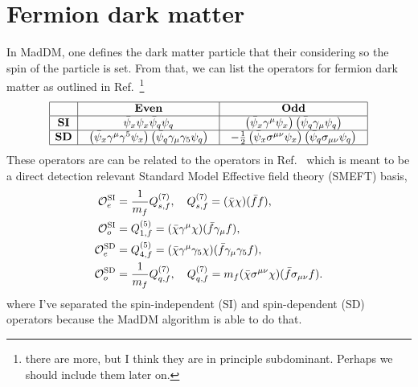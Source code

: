 \documentclass[a4paper,11pt]{article}
\begin{document}
\section{Fermion dark matter}
In MadDM, one defines the dark matter particle that their considering so the spin of the particle is set. From that, we can list the operators for fermion dark matter as outlined in Ref.~\cite{Backovic:2015cra}\footnote{there are more, but I think they are in principle subdominant. Perhaps we should include them later on. }  
\[
\begin{array}{|c|c|c|}
\hline
 & \textbf{Even} & \textbf{Odd} \\
\hline
\textbf{SI} & \bar{\psi}_x \psi_x \bar{\psi}_q \psi_q & \left(\bar{\psi}_x \gamma^\mu \psi_x\right) \left(\bar{\psi}_q \gamma_\mu \psi_q \right)\\
\hline
\textbf{SD} & 
\begin{array}{c}
\left(\bar{\psi}_x \gamma^{\mu}\gamma^5  \psi_x \right)\left(\bar{\psi}_q \gamma_\mu\gamma_5 \psi_q \right)
\end{array} & 
\begin{array}{c}
-\frac{1}{2} \left(\bar{\psi}_x \sigma^{\mu \nu} \psi_x \right)
\left(\bar{\psi}_q \sigma_{\mu \nu} \psi_q\right)
\end{array} \\
\hline
\end{array}
\]
These operators are can be related to the operators in Ref.~\cite{Bishara:2017nnn} which is meant to be a direct detection relevant Standard Model Effective field theory (SMEFT) basis, 
\begin{align*}
\mathcal{O}^{\rm SI}_{e} &= \frac{1}{m_f} Q^{(7)}_{s,f}, \quad Q^{(7)}_{s,f} = (\bar{\chi} \chi)(\bar{f} f), \\
\mathcal{O}^{\rm SI}_{o}&= Q^{(5)}_{1,f} = (\bar{\chi} \gamma^\mu \chi)(\bar{f} \gamma_\mu  f), \\
\mathcal{O}^{\rm SD}_{e}&= Q^{(5)}_{4,f} = (\bar{\chi} \gamma^{\mu }\gamma_5 \chi)(\bar{f} \gamma_{\mu }\gamma_5 f), \\
\mathcal{O}^{\rm SD}_{o} &= \frac{1}{m_f} Q^{(7)}_{q,f}, \quad Q^{(7)}_{q,f} = m_f (\bar{\chi} \sigma^{\mu \nu} \chi)(\bar{f} \sigma_{\mu \nu} f).
\end{align*}
where I've separated the spin-independent (SI) and spin-dependent (SD) operators because the MadDM algorithm is able to do that. 






\end{document}
